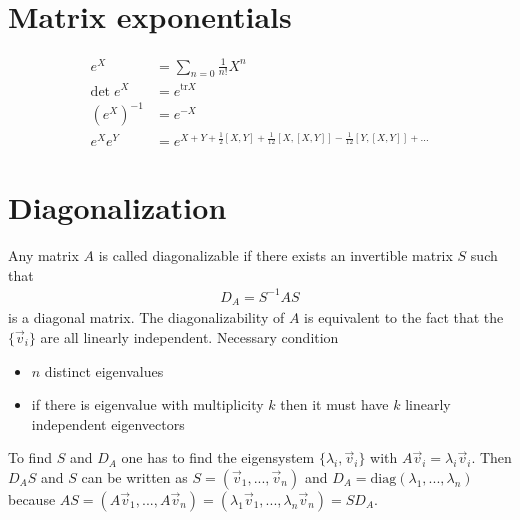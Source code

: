 \documentclass[../main.tex]{subfiles}
\begin{document}
\section{Matrix exponentials}
\begin{align}
e^X&=\sum_{n=0}\frac{1}{n!}X^n\\
\text{det}\;e^X&=e^{\text{tr} X} \\
\left(e^X\right)^{-1}&=e^{-X}\\
e^Xe^Y&=e^{X+Y+\frac{1}{2}[X,Y]+\frac{1}{12}[X,[X,Y]]-\frac{1}{12}[Y,[X,Y]]+...}
\end{align}


\section{Diagonalization}
Any  matrix $A$ is called diagonalizable if there exists an invertible matrix $S$ such that
\begin{align}
    D_A=S^{-1}AS
\end{align}
is a diagonal matrix. The diagonalizability of $A$ is equivalent to the fact that the $\{\vec{v}_i\}$ are all linearly independent. Necessary condition
\begin{itemize}
\item $n$ distinct eigenvalues
\item if there is eigenvalue with multiplicity $k$ then it must have $k$ linearly independent eigenvectors
\end{itemize}

To find $S$ and $D_A$ one has to find the eigensystem $\{\lambda_i,\vec{v}_i\}$ with $A\vec{v}_i=\lambda_i\vec{v}_i$. Then $D_AS$ and $S$ can be written as $S=(\vec{v}_1,...,\vec{v}_n)$ and $D_A=\text{diag}(\lambda_1,...,\lambda_n)$ because $AS=(A\vec{v}_1,...,A\vec{v}_n)=(\lambda_1\vec{v}_1,...,\lambda_n\vec{v}_n)=SD_A$.
\end{document}
